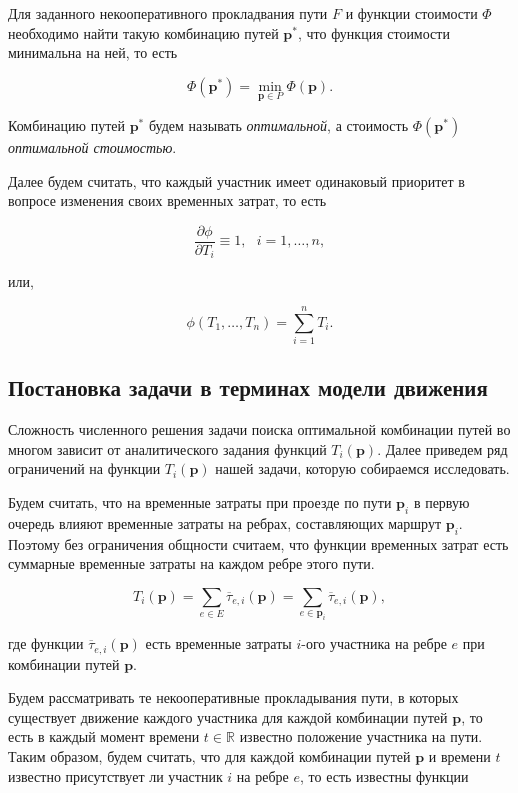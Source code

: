 \documentclass[12pt, a4paper]{article}
\DeclareMathOperator*{\minn}{min}
\begin{document}
Для заданного некооперативного прокладвания пути $F$ и функции стоимости $\Phi$ необходимо найти такую комбинацию путей $\textbf{p}^*$, что функция стоимости минимальна на ней, то есть

\begin{equation}
	\label{eq:target_global_task_T} 
	\Phi (\textbf{p}^*) = \minn\limits_{ \textbf{p} \in P} \Phi (\textbf{p}).
\end{equation}

Комбинацию путей $\textbf{p}^*$ будем называть \textit {оптимальной}, а стоимость  $ \Phi (\textbf{p}^*)$ \textit {оптимальной стоимостью}.

Далее будем считать, что каждый участник имеет одинаковый приоритет в вопросе изменения своих временных затрат, то есть 

\begin{equation*}
	\frac{\partial \phi}{\partial T_i} \equiv 1, \text{ } i = 1, \ldots, n,
\end{equation*}

или, 

\begin{equation*}
\phi(T_1, \ldots, T_n) = \sum\limits_{i = 1}^nT_i.
\end{equation*}

\subsection{Постановка задачи в терминах модели движения}

Сложность численного решения задачи поиска оптимальной комбинации путей во многом зависит от аналитического задания функций $T_i (\textbf{p})$. Далее приведем ряд ограничений на функции $T_i (\textbf{p})$ нашей задачи, которую собираемся исследовать.

Будем считать, что на временные затраты при проезде по пути $\textbf{p}_i$ в первую очередь влияют временные затраты на ребрах, составляющих маршрут $\textbf{p}_i$. Поэтому без ограничения общности считаем, что функции временных затрат есть суммарные временные затраты на каждом ребре этого пути.

$$T_i (\textbf{p}) = \sum \limits_{e \in E} \overline{\tau}_{e, i} (\textbf{p}) = \sum \limits_{e \in \textbf{p}_i} \overline{\tau}_{e, i} (\textbf{p}), $$

где функции $\overline{\tau}_{e, i} (\textbf{p})$ есть временные затраты $i$-ого участника на ребре $e$ при комбинации путей $\textbf{p}$. 

Будем рассматривать те некооперативные прокладывания пути, в которых существует движение каждого участника для каждой комбинации путей $\textbf{p}$, то есть в каждый момент времени $t \in \mathbb{R}$ известно положение участника на пути. Таким образом, будем считать, что для каждой комбинации путей $\textbf{p}$ и времени $t$ известно присутствует ли участник $i$ на ребре $e$, то есть известны функции
\end{document}
